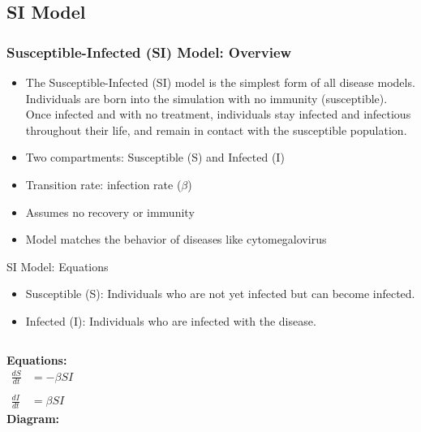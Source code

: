 \subsection{SI Model}
\small
\begin{frame}
  \frametitle{Susceptible-Infected (SI) Model: Overview}
  \begin{itemize}
    \item  The  Susceptible-Infected (SI) model is the simplest form of all disease models. Individuals are born into the simulation with no immunity (susceptible). Once infected and with no treatment, individuals stay infected and infectious throughout their life, and remain in contact with the susceptible population.
    \item Two compartments: Susceptible (S) and Infected (I)
    \item Transition rate: infection rate ($\beta$)
    \item Assumes no recovery or immunity
    \item  Model matches the behavior of diseases like cytomegalovirus 
  \end{itemize}
\end{frame}

\begin{frame}{SI Model: Equations}
  \begin{itemize}
    \item Susceptible (S): Individuals who are not yet infected but can become infected.
    \item Infected (I): Individuals who are infected with the disease.
  \end{itemize}
\vfill
\begin{columns}[t]
\textbf{Equations:}
  \begin{align*}
    \frac{dS}{dt} &= -\beta S I \\
    \\
    \frac{dI}{dt} &= \beta S I
  \end{align*}
\textbf{Diagram:}
  \begin{center}
  \end{center}
\end{columns}
\end{frame}

